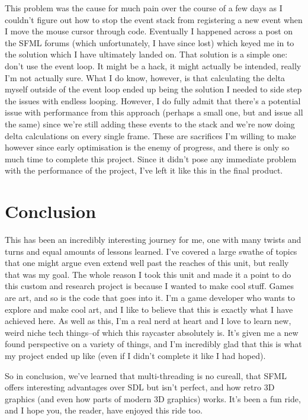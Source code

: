 \documentclass{article}
\begin{document}
This problem was the cause for much pain over the course of a few days as I
couldn't figure out how to stop the event stack from registering a new event
when I move the mouse cursor through code. Eventually I happened across a post
on the SFML forums (which unfortunately, I have since lost) which keyed me in to
the solution which I have ultimately landed on. That solution is a simple one:
don't use the event loop. It might be a hack, it might actually be intended,
really I'm not actually sure. What I do know, however, is that calculating the
delta myself outside of the event loop ended up being the solution I needed to
side step the issues with endless looping. However, I do fully admit that
there's a potential issue with performance from this approach (perhaps a small
one, but and issue all the same) since we're still adding these events to the
stack and we're now doing delta calculations on every single frame. These are
sacrifices I'm willing to make however since early optimisation is the enemy of
progress, and there is only so much time to complete this project. Since it
didn't pose any immediate problem with the performance of the project, I've
left it like this in the final product.

\section{Conclusion}
This has been an incredibly interesting journey for me, one with many twists and
turns and equal amounts of lessons learned. I've covered a large swathe of
topics that one might argue even extend well past the reaches of this unit, but
really that was my goal. The whole reason I took this unit and made it a point
to do this custom and research project is because I wanted to make cool stuff.
Games are art, and so is the code that goes into it. I'm a game developer who
wants to explore and make cool art, and I like to believe that this is exactly
what I have achieved here. As well as this, I'm a real nerd at heart and I love
to learn new, weird niche tech things--of which this raycaster absolutely is.
It's given me a new found perspective on a variety of things, and I'm incredibly
glad that this is what my project ended up like (even if I didn't complete it
like I had hoped).

So in conclusion, we've learned that multi-threading is no cureall, that SFML
offers interesting advantages over SDL but isn't perfect, and how retro 3D
graphics (and even how parts of modern 3D graphics) works. It's been a fun ride,
and I hope you, the reader, have enjoyed this ride too.
\end{document}

